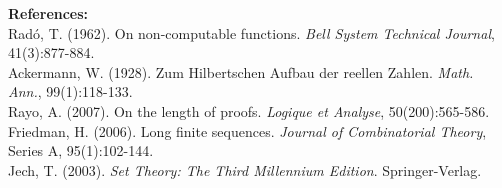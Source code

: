 \begin{technical}
\vspace{0.5em}
\textbf{References:}\\
Radó, T. (1962). On non-computable functions. \textit{Bell System Technical Journal}, 41(3):877-884.\\
Ackermann, W. (1928). Zum Hilbertschen Aufbau der reellen Zahlen. \textit{Math. Ann.}, 99(1):118-133.\\
Rayo, A. (2007). On the length of proofs. \textit{Logique et Analyse}, 50(200):565-586.\\
Friedman, H. (2006). Long finite sequences. \textit{Journal of Combinatorial Theory}, Series A, 95(1):102-144.\\
Jech, T. (2003). \textit{Set Theory: The Third Millennium Edition}. Springer-Verlag.
\end{technical}
